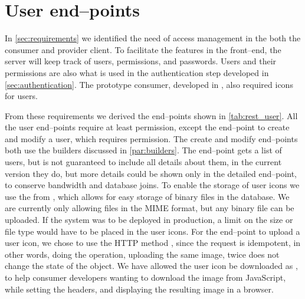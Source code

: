 \section{User end--points}

In \cref{sec:requirements} we identified the need of access management in the
both the consumer and provider client. To facilitate the features in the
front--end, the server will keep track of users, permissions, and passwords.
Users and their permissions are also what is used in the authentication step
developed in \cref{sec:authentication}. The prototype consumer, developed in
, also required icons for users.


From these requirements we derived the end--points shown in \cref{tab:rest_user}.
All the user end--points require at least  permission, except the
end--point to create and modify a user, which requires 
permission. The create and modify end--points both use the builders discussed in
\cref{par:builders}. The  end--point gets a list of users,
but is not guaranteed to include all details about them, in the current version
they do, but more details could be shown only in the detailed 
end--point, to conserve bandwidth and database joins. To enable the storage of
user icons we use the  from ,
which allows for easy storage of binary files in the database. We are currently
only allowing files in the  \ac{MIME} format, but any binary
file can be uploaded.  If the system was to be deployed in production, a limit
on the size or file type would have to be placed in the user icons. For the
end--point to upload a user icon, we chose to use the HTTP method ,
since the request is idempotent, in other words, doing the operation, uploading
the same image, twice does not change the state of the object. We have allowed
the user icon be downloaded as , to help consumer developers
wanting to download the image from JavaScript, while setting the headers, and
displaying the resulting image in a browser.

